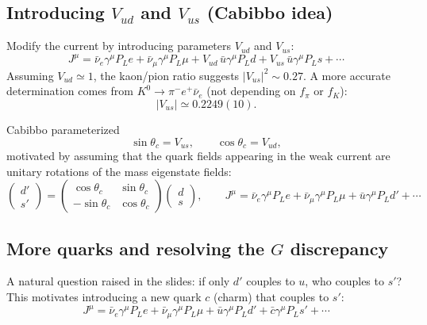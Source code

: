 \subsection{Introducing $V_{ud}$ and $V_{us}$ (Cabibbo idea)}
Modify the current by introducing parameters $V_{ud}$ and $V_{us}$:
\begin{equation}
J^\mu
=
\bar\nu_e\gamma^\mu P_L e
+\bar\nu_\mu\gamma^\mu P_L \mu
+V_{ud}\,\bar u\gamma^\mu P_L d
+V_{us}\,\bar u\gamma^\mu P_L s+\cdots
\end{equation}
Assuming $V_{ud}\simeq 1$, the kaon/pion ratio suggests $|V_{us}|^2\sim 0.27$.
A more accurate determination comes from $K^0\to \pi^- e^+\bar\nu_e$ (not depending on $f_\pi$ or $f_K$):
\begin{equation}
|V_{us}|\simeq 0.2249(10).
\end{equation}

Cabibbo parameterized
\begin{equation}
\sin\theta_c=V_{us},
\qquad
\cos\theta_c=V_{ud},
\end{equation}
motivated by assuming that the quark fields appearing in the weak current are unitary rotations
of the mass eigenstate fields:
\begin{equation}
\begin{pmatrix}
d'\\
s'
\end{pmatrix}
=
\begin{pmatrix}
\cos\theta_c & \sin\theta_c\\
-\sin\theta_c & \cos\theta_c
\end{pmatrix}
\begin{pmatrix}
d\\
s
\end{pmatrix},
\qquad
J^\mu=\bar\nu_e\gamma^\mu P_L e+\bar\nu_\mu\gamma^\mu P_L\mu+\bar u\gamma^\mu P_L d'+\cdots
\end{equation}

\subsection{More quarks and resolving the $G$ discrepancy}
A natural question raised in the slides: if only $d'$ couples to $u$, who couples to $s'$?
This motivates introducing a new quark $c$ (charm) that couples to $s'$:
\begin{equation}
J^\mu=\bar\nu_e\gamma^\mu P_L e+\bar\nu_\mu\gamma^\mu P_L\mu+\bar u\gamma^\mu P_L d'+\bar c\gamma^\mu P_L s'+\cdots
\end{equation}

